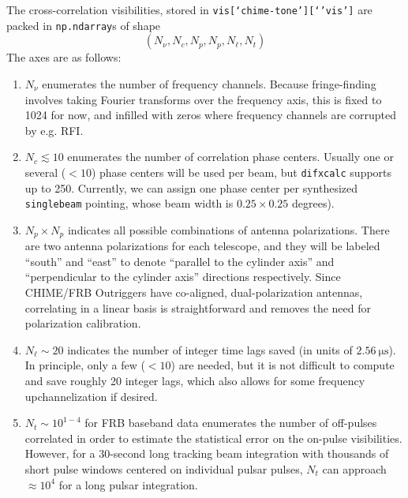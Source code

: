 The cross-correlation visibilities, stored in \texttt{\texttt{vis[`chime-tone'][`'vis']}} are packed in \texttt{np.ndarray}s of shape
%    
$$(N_\nu, N_{c}, N_{p}, N_{p},N_{\ell},N_t)$$
%
The axes are as follows:
\begin{enumerate}
    \item $N_\nu$ enumerates the number of frequency channels. Because fringe-finding involves taking Fourier transforms over the frequency axis, this is fixed to 1024 for now, and infilled with zeros where frequency channels are corrupted by e.g. RFI.
    \item $N_{c} \lesssim10$ enumerates the number of correlation phase centers. Usually one or several ($<10$) phase centers will be used per beam, but \texttt{difxcalc} supports up to 250. Currently, we can assign one phase center per synthesized \texttt{singlebeam} pointing, whose beam width is $0.25 \times 0.25$ degrees). %
    \item $N_p \times N_p$ indicates all possible combinations of antenna polarizations. There are two antenna polarizations for each telescope, and they will be labeled ``south'' and ``east'' to denote ``parallel to the cylinder axis'' and ``perpendicular to the cylinder axis'' directions respectively. Since CHIME/FRB Outriggers have co-aligned, dual-polarization antennas, correlating in a linear basis is straightforward and removes the need for polarization calibration.
    \item $N_{\ell} \sim 20$ indicates the number of integer time lags saved (in units of $\SI{2.56}{\us}$). In principle, only a few ($<10$) are needed, but it is not difficult to compute and save roughly 20 integer lags, which also allows for some frequency upchannelization if desired.
    \item $N_{t} \sim 10^{1-4}$ for FRB baseband data enumerates the number of off-pulses correlated in order to estimate the statistical error on the on-pulse visibilities. However, for a 30-second long tracking beam integration with thousands of short pulse windows centered on individual pulsar pulses, $N_{t}$ can approach $\approx 10^4$ for a long pulsar integration.
\end{enumerate}

